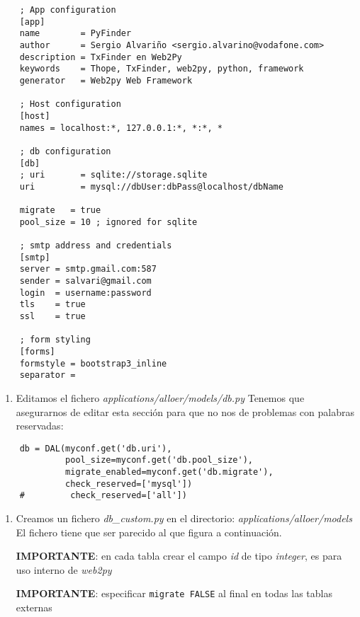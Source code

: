 \documentclass[12pt,spanish,]{article}
\providecommand{\tightlist}{%
  \setlength{\itemsep}{0pt}\setlength{\parskip}{0pt}}
\begin{document}
\begin{verbatim}
    ; App configuration
    [app]
    name        = PyFinder
    author      = Sergio Alvariño <sergio.alvarino@vodafone.com>
    description = TxFinder en Web2Py
    keywords    = Thope, TxFinder, web2py, python, framework
    generator   = Web2py Web Framework
     
    ; Host configuration
    [host]
    names = localhost:*, 127.0.0.1:*, *:*, *
     
    ; db configuration
    [db]
    ; uri       = sqlite://storage.sqlite
    uri         = mysql://dbUser:dbPass@localhost/dbName
     
    migrate   = true
    pool_size = 10 ; ignored for sqlite
     
    ; smtp address and credentials
    [smtp]
    server = smtp.gmail.com:587
    sender = salvari@gmail.com
    login  = username:password
    tls    = true
    ssl    = true
     
    ; form styling
    [forms]
    formstyle = bootstrap3_inline
    separator = 
\end{verbatim}

\begin{enumerate}
\def\labelenumi{\arabic{enumi}.}
\setcounter{enumi}{2}
\tightlist
\item
  Editamos el fichero \emph{applications/alloer/models/db.py} Tenemos
  que asegurarnos de editar esta sección para que no nos de problemas
  con palabras reservadas:
\end{enumerate}

\begin{verbatim}
    db = DAL(myconf.get('db.uri'),
             pool_size=myconf.get('db.pool_size'),
             migrate_enabled=myconf.get('db.migrate'),
             check_reserved=['mysql'])
    #         check_reserved=['all'])
\end{verbatim}

\begin{enumerate}
\def\labelenumi{\arabic{enumi}.}
\setcounter{enumi}{3}
\item
  Creamos un fichero \emph{db\_custom.py} en el directorio:
  \emph{applications/alloer/models} El fichero tiene que ser parecido al
  que figura a continuación.

  \textbf{IMPORTANTE}: en cada tabla crear el campo \emph{id} de tipo
  \emph{integer}, es para uso interno de \emph{web2py}

  \textbf{IMPORTANTE}: especificar \texttt{migrate\ FALSE} al final en
  todas las tablas externas
\end{enumerate}
\end{document}
